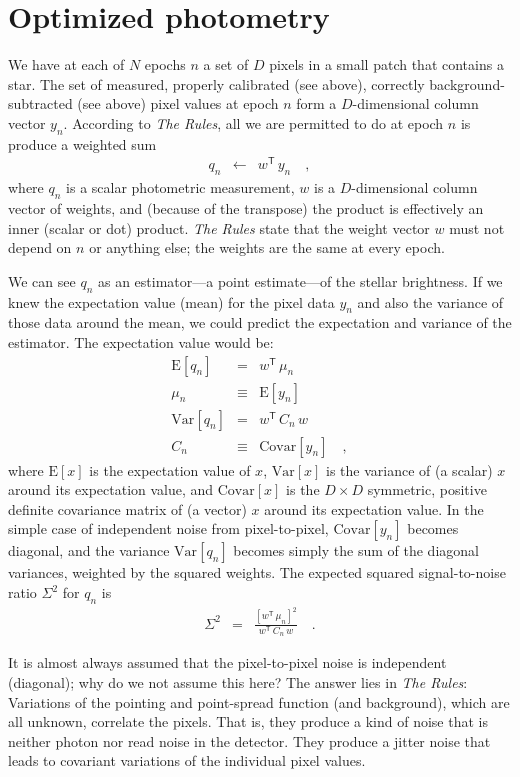 \documentclass[12pt, letterpaper, preprint]{aastex}
\newcommand{\transpose}[1]{{#1}^{\!\mathsf T}}
\newcommand{\E}[1]{\mathrm{E}[{#1}]}
\newcommand{\Var}[1]{\mathrm{Var}[{#1}]}
\newcommand{\Covar}[1]{\mathrm{Covar}[{#1}]}
\begin{document}
\section{Optimized photometry}

We have at each of $N$ epochs $n$ a set of $D$ pixels in a small patch
  that contains a star.
The set of measured, properly calibrated (see above),
  correctly background-subtracted (see above)
  pixel values at epoch $n$ form a $D$-dimensional column vector $y_n$.
According to \emph{The Rules}, all we are permitted to do at epoch $n$
  is produce a weighted sum
\begin{eqnarray}
q_n &\leftarrow& \transpose{w}\, y_n
\quad ,
\end{eqnarray}
  where $q_n$ is a scalar photometric measurement,
  $w$ is a $D$-dimensional column vector of weights,
  and (because of the transpose)
  the product is effectively an inner (scalar or dot) product.
\emph{The Rules} state that the weight vector $w$ must not depend on $n$ or anything else;
  the weights are the same at every epoch.

We can see $q_n$ as an estimator---a point estimate---of the stellar brightness.
If we knew the expectation value (mean) for the pixel data $y_n$ and also the
  variance of those data around the mean,
  we could predict the expectation and variance of the estimator.
The expectation value would be:
\begin{eqnarray}
\E{q_n} &=& \transpose{w}\, \mu_n
\\
\mu_n &\equiv& \E{y_n}
\\
\Var{q_n} &=& \transpose{w}\, C_n\, w
\\
C_n &\equiv& \Covar{y_n}
\quad ,
\end{eqnarray}
  where $\E{x}$ is the expectation value of $x$,
  $\Var{x}$ is the variance of (a scalar) $x$ around its expectation value,
  and $\Covar{x}$ is the $D\times D$ symmetric, positive definite covariance matrix
  of (a vector) $x$ around its expectation value.
In the simple case of independent noise from pixel-to-pixel,
  $\Covar{y_n}$ becomes diagonal,
  and the variance $\Var{q_n}$ becomes simply the sum of the diagonal variances,
  weighted by the squared weights.
The expected squared signal-to-noise ratio $\Sigma^2$ for $q_n$ is
\begin{eqnarray}
\Sigma^2 &=& \frac{[\transpose{w}\, \mu_n]^2}{\transpose{w}\, C_n\, w}
\quad .
\end{eqnarray}

It is almost always assumed that the pixel-to-pixel noise is independent (diagonal);
  why do we not assume this here?
The answer lies in \emph{The Rules}:
Variations of the pointing and point-spread function (and background),
  which are all unknown,
  correlate the pixels.
That is, they produce a kind of noise that is neither photon nor read noise in the detector.
They produce a jitter noise that leads to covariant variations of the individual pixel values.
\end{document}
